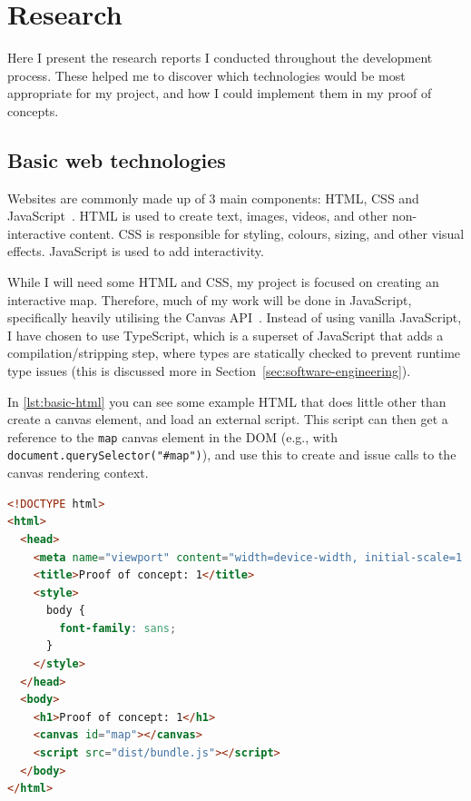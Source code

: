 \documentclass[hyphens]{final_report}
\begin{document}
\clearpage
\chapter{Research}

Here I present the research reports I conducted throughout the development process. These helped me to discover which technologies would be most appropriate for my project, and how I could implement them in my proof of concepts.

\section{Basic web technologies}

Websites are commonly made up of 3 main components: HTML, CSS and JavaScript~\cite{mdn-html}. HTML is used to create text, images, videos, and other non-interactive content. CSS is responsible for styling, colours, sizing, and other visual effects. JavaScript is used to add interactivity.

While I will need some HTML and CSS, my project is focused on creating an interactive map. Therefore, much of my work will be done in JavaScript, specifically heavily utilising the Canvas API~\cite{mdn-canvas-api}. Instead of using vanilla JavaScript, I have chosen to use TypeScript, which is a superset of JavaScript that adds a compilation/stripping step, where types are statically checked to prevent runtime type issues (this is discussed more in Section~\ref{sec:software-engineering}).

In \autoref{lst:basic-html} you can see some example HTML that does little other than create a canvas element, and load an external script. This script can then get a reference to the \texttt{map} canvas element in the DOM (e.g., with \texttt{document.querySelector("\#map")}), and use this to create and issue calls to the canvas rendering context.

\begin{lstlisting}[caption=Basic HTML to run an external script with some basic styling, language=html, label=lst:basic-html]
<!DOCTYPE html>
<html>
  <head>
    <meta name="viewport" content="width=device-width, initial-scale=1.0" />
    <title>Proof of concept: 1</title>
    <style>
      body {
        font-family: sans;
      }
    </style>
  </head>
  <body>
    <h1>Proof of concept: 1</h1>
    <canvas id="map"></canvas>
    <script src="dist/bundle.js"></script>
  </body>
</html>
\end{lstlisting}
\end{document}
